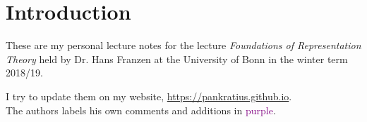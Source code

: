 \chapter*{Introduction}
These are my personal lecture notes for the lecture \textit{Foundations of Representation Theory} held by Dr. Hans Franzen at the University of Bonn in the winter term 2018/19.\par
I try to update them on my website, \url{https://pankratius.github.io}.\\
The authors labels his own comments and additions in \textcolor{purple}{purple}.
